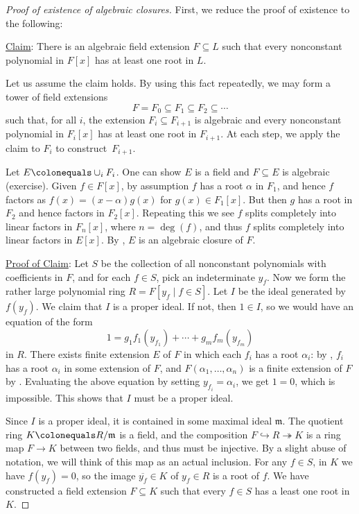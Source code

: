 \documentclass[12pt]{report}
\numberwithin{equation}{section}
\numberwithin{theorem}{chapter}
\theoremstyle{definition}
\newtheorem*{basic properties}{Basic Properties}
\newtheorem*{Important Remark}{Important Remark}
\newcommand{\m}{\mathfrak{m}}
\begin{document}


\begin{proof}[Proof of existence of algebraic closures]
First, we reduce the proof of existence to the following:

\underline{Claim}: There is an algebraic field extension $F \subseteq L$ such that every nonconstant polynomial in $F[x]$ has at least one root in $L$.

Let us assume the claim holds. By using this fact repeatedly, we may form a tower of field extensions
$$F = F_0 \subseteq F_1 \subseteq F_2 \subseteq  \cdots$$
such that, for all $i$, the extension $F_i \subseteq F_{i+1}$ is algebraic and every nonconstant polynomial in $F_i[x]$ has at least one root in $F_{i+1}$. At each step, we apply the claim to $F_i$ to construct~$F_{i+1}$.

Let $E \colonequals \cup_i F_i$. One can show $E$ is a field and $F \subseteq E$ is algebraic (exercise). 
Given $f \in F[x]$, by assumption $f$ has a root $\alpha$ in $F_1$, and hence $f$ factors as $f(x) = (x-\alpha) g(x)$ for $g(x) \in F_1[x]$. But then $g$ has a root in $F_2$ and hence factors in $F_2[x]$. Repeating this we see $f$ splits completely into linear factors in $F_n[x]$, where $n = \deg(f)$, and thus $f$ splits completely into linear factors in $E[x]$. By , $E$ is an algebraic closure of $F$.

\underline{Proof of Claim}:
Let $S$ be the collection of all nonconstant polynomials with coefficients in $F$, and for each $f \in S$, pick an indeterminate $y_f$.
Now we form the rather large polynomial ring $R = F[y_f \mid f \in S]$. Let $I$ be the ideal generated by $f(y_f)$. We claim that  $I$ is a proper ideal. If not, then $1 \in I$, so we would have an equation of the form
$$1 = g_1 f_1(y_{f_1}) + \cdots + g_m f_m(y_{f_m})$$
in $R$. There exists finite extension $E$ of $F$ in which each $f_i$ has a root $\alpha_i$: by , $f_i$ has a root $\alpha_i$ in some extension of $F$, and $F(\alpha_1, \ldots, \alpha_n)$ is a finite extension of $F$ by . Evaluating the above equation by setting $y_{f_i} = \alpha_i$, we get $1 = 0$, which is impossible. This shows that $I$ must be a proper ideal. 

Since $I$ is a proper ideal, it is contained in some maximal ideal $\m$. The quotient ring $K \colonequals R/\m$ is a field, and the composition $F \hookrightarrow R \twoheadrightarrow K$ is a ring map $F \to K$ between two fields, and thus must be injective. By a slight abuse of notation, we will think of this map as an actual inclusion. 
For any $f \in S$, in $K$ we have $f(y_f) = 0$, so the image $\overline{y_f} \in K$ of $y_f \in R$ is a root of $f$. We have constructed a field extension $F \subseteq K$ such that every $f \in S$ has a least one root in~$K$. 


\end{proof}
\end{document}
